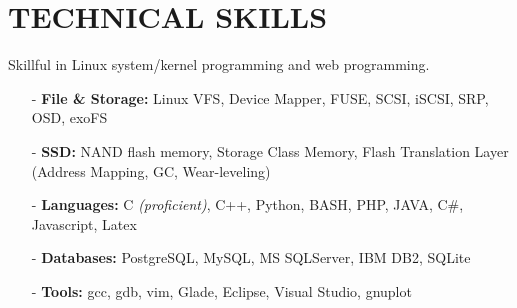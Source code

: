 \section{TECHNICAL SKILLS}
\vspace{0.03in}
Skillful in Linux system/kernel programming and web programming.
\begin{itemize}[leftmargin=*]
\setlength\itemsep{-0.02in}
\item[-] {\bf File \& Storage:} Linux VFS, Device Mapper, FUSE, SCSI, iSCSI, SRP, OSD,
exoFS
\item[-] {\bf SSD:} NAND flash memory, Storage Class Memory,
	Flash Translation Layer (Address Mapping, GC, Wear-leveling)
\item[-] {\bf Languages:} C {\footnotesize \it (proficient)}, C++,
	Python, BASH, PHP, JAVA, C\#,
	Javascript, Latex
\item[-] {\bf Databases:} PostgreSQL, MySQL, MS SQLServer, IBM DB2, SQLite
\item[-] {\bf Tools:} gcc, gdb, vim, Glade, Eclipse, Visual Studio, gnuplot
\end{itemize}

